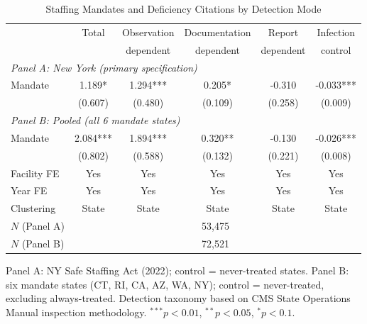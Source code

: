 \begin{table}[htbp]
\centering
\caption{Staffing Mandates and Deficiency Citations by Detection Mode}
\label{tab:main}
\begin{tabular}{lccccc}
\toprule
 & Total & Observation & Documentation & Report & Infection \\
 & & dependent & dependent & dependent & control \\
\midrule
\multicolumn{6}{l}{\textit{Panel A: New York (primary specification)}} \\[0.3em]
Mandate & 1.189* & 1.294*** & 0.205* & -0.310 & -0.033*** \\
 & (0.607) & (0.480) & (0.109) & (0.258) & (0.009) \\[0.5em]
\multicolumn{6}{l}{\textit{Panel B: Pooled (all 6 mandate states)}} \\[0.3em]
Mandate & 2.084*** & 1.894*** & 0.320** & -0.130 & -0.026*** \\
 & (0.802) & (0.588) & (0.132) & (0.221) & (0.008) \\
\midrule
Facility FE & Yes & Yes & Yes & Yes & Yes \\
Year FE & Yes & Yes & Yes & Yes & Yes \\
Clustering & State & State & State & State & State \\
$N$ (Panel A) & \multicolumn{5}{c}{53,475} \\
$N$ (Panel B) & \multicolumn{5}{c}{72,521} \\
\bottomrule
\end{tabular}
\begin{flushleft}\small
Panel A: NY Safe Staffing Act (2022); control = never-treated states. Panel B: six mandate states (CT, RI, CA, AZ, WA, NY); control = never-treated, excluding always-treated. Detection taxonomy based on CMS State Operations Manual inspection methodology. $^{***}p<0.01$, $^{**}p<0.05$, $^{*}p<0.1$.
\end{flushleft}
\end{table}
